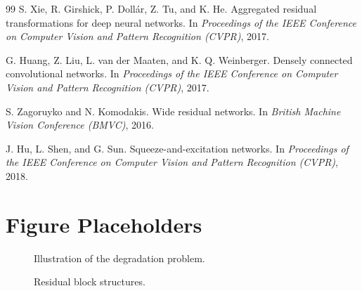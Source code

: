 \documentclass[11pt,a4paper]{article}
\begin{document}
\begin{thebibliography}{99}
S. Xie, R. Girshick, P. Dollár, Z. Tu, and K. He.
\newblock Aggregated residual transformations for deep neural networks.
\newblock In \emph{Proceedings of the IEEE Conference on Computer Vision and Pattern Recognition (CVPR)}, 2017.

G. Huang, Z. Liu, L. van der Maaten, and K. Q. Weinberger.
\newblock Densely connected convolutional networks.
\newblock In \emph{Proceedings of the IEEE Conference on Computer Vision and Pattern Recognition (CVPR)}, 2017.

S. Zagoruyko and N. Komodakis.
\newblock Wide residual networks.
\newblock In \emph{British Machine Vision Conference (BMVC)}, 2016.

J. Hu, L. Shen, and G. Sun.
\newblock Squeeze-and-excitation networks.
\newblock In \emph{Proceedings of the IEEE Conference on Computer Vision and Pattern Recognition (CVPR)}, 2018.

\end{thebibliography}

\appendix

\section{Figure Placeholders}
\label{app:figures}

\begin{figure}[ht]
\centering
{}
\caption{Illustration of the degradation problem.}
\label{fig:degradation}
\end{figure}

\begin{figure}[ht]
\centering
{}
\caption{Residual block structures.}
\label{fig:blocks}
\end{figure}
\end{document}
